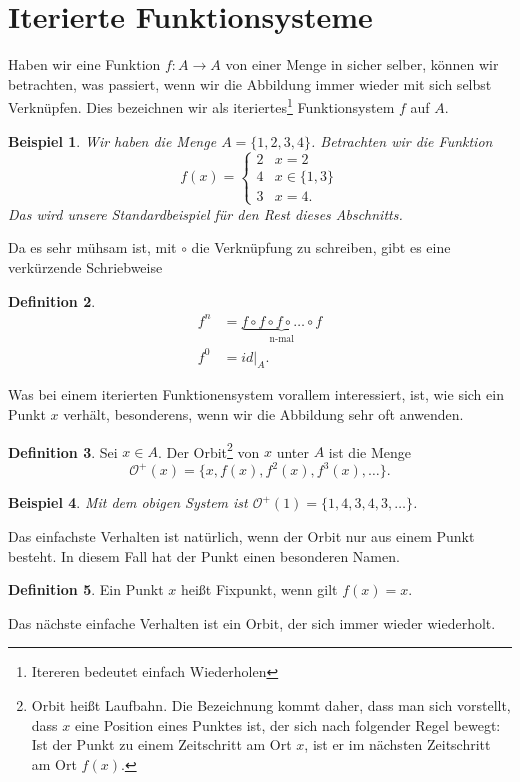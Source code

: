 \documentclass[a4paper,ngerman,12pt]{scrartcl}
\theoremstyle{definition}
\newtheorem{defn}{Definition}[section]
\theoremstyle{plain}
\newtheorem{beispiel}[defn]{Beispiel}
\theoremstyle{remark}
\begin{document}
\section{Iterierte Funktionsysteme}
Haben wir eine Funktion $f:A\longrightarrow A$ von einer Menge in sicher selber, können wir betrachten, was passiert, wenn wir die Abbildung immer wieder mit sich selbst Verknüpfen. Dies bezeichnen wir als iteriertes\footnote{Itereren bedeutet einfach Wiederholen} Funktionsystem $f$ auf $A$.
\begin{beispiel}
Wir haben die Menge $A=\{1,2,3,4 \}$. Betrachten wir die Funktion
\[
f(x)=\begin{cases}
2 & x=2 \\
4 & x\in\{1,3\} \\
3 & x=4.
\end{cases}
\]
Das wird unsere Standardbeispiel für den Rest dieses Abschnitts. 
\end{beispiel}
Da es sehr mühsam ist, mit $\circ$ die Verknüpfung zu schreiben, gibt es eine verkürzende Schriebweise
\begin{defn}
\begin{align*}
f^n &= \underbrace{f \circ f \circ f \circ \ldots \circ f}_{\text{n-mal}}\\
f^0 &= id|_A.
\end{align*} 
\end{defn}
Was bei einem iterierten Funktionensystem vorallem interessiert, ist, wie sich ein Punkt $x$ verhält, besonderens, wenn wir die Abbildung sehr oft anwenden.
\begin{defn}
Sei $x\in A$. Der Orbit\footnote{Orbit heißt Laufbahn. Die Bezeichnung kommt daher, dass man sich vorstellt, dass $x$ eine Position eines Punktes ist, der sich nach folgender Regel bewegt: Ist der Punkt zu einem Zeitschritt am Ort $x$, ist er im nächsten Zeitschritt am Ort $f(x)$.} von $x$ unter $A$ ist die Menge
\[
\mathcal{O}^+(x) = \{x, f(x), f^2(x), f^3(x) ,\ldots\}.
\]
\end{defn}
\begin{beispiel}
Mit dem obigen System ist $\mathcal{O}^+(1) = \{1,4,3,4,3,\ldots\}$.
\end{beispiel}
Das einfachste Verhalten ist natürlich, wenn der Orbit nur aus einem Punkt besteht. In diesem Fall hat der Punkt einen besonderen Namen.
\begin{defn}
Ein Punkt $x$ heißt Fixpunkt, wenn gilt $f(x) =x$.
\end{defn}
Das nächste einfache Verhalten ist ein Orbit, der sich immer wieder wiederholt.
\end{document}

